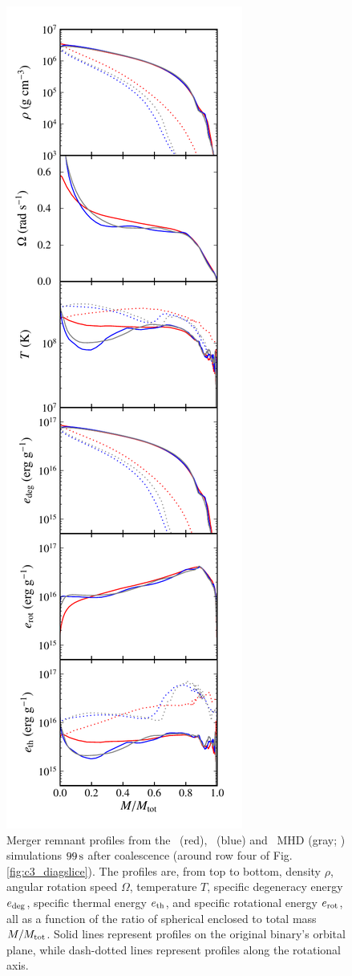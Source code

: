 \begin{figure}
\centering
\includegraphics[angle=0,width=0.35\columnwidth]{chapter3_zhu+u/figures/curves.pdf}
\caption{Merger remnant profiles from the \gasoline\ (red), \arepo\ (blue) and \arepo\ MHD (gray; \citealt{zhu+15}) simulations $99\,\mathrm{s}$ after coalescence (around row four of Fig. \ref{fig:c3_diagslice}).  The profiles are, from top to bottom, density $\rho$, angular rotation speed $\Omega$, temperature $T$, specific degeneracy energy  $e_{\rm deg}$, specific thermal energy $e_{\rm th}$, and specific rotational energy $e_{\rm rot}$, all as a function of the ratio of spherical enclosed to total mass $M/M_{\rm tot}$.  Solid lines represent profiles on the original binary's orbital plane, while dash-dotted lines represent profiles along the rotational axis.}
\label{fig:c3_curves}
\end{figure}

